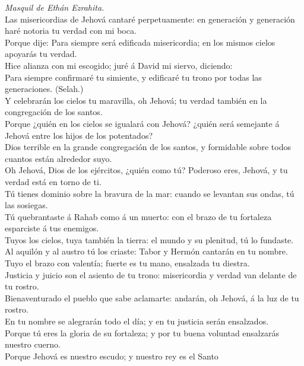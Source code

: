  \emph{Masquil de Ethán Ezrahita.}\\
Las misericordias de Jehová cantaré perpetuamente: en generación y
generación haré notoria tu verdad con mi boca.\\
 Porque dije: Para siempre será edificada misericordia; en
los mismos cielos apoyarás tu verdad.\\
 Hice alianza con mi escogido; juré á David mi siervo,
diciendo:\\
 Para siempre confirmaré tu simiente, y edificaré tu trono
por todas las generaciones. (Selah.)\\
 Y celebrarán los cielos tu maravilla, oh Jehová; tu verdad
también en la congregación de los santos.\\
 Porque ¿quién en los cielos se igualará con Jehová? ¿quién
será semejante á Jehová entre los hijos de los potentados?\\
 Dios terrible en la grande congregación de los santos, y
formidable sobre todos cuantos están alrededor suyo.\\
 Oh Jehová, Dios de los ejércitos, ¿quién como tú? Poderoso
eres, Jehová, y tu verdad está en torno de ti.\\
 Tú tienes dominio sobre la bravura de la mar: cuando se
levantan sus ondas, tú las sosiegas.\\
 Tú quebrantaste á Rahab como á un muerto: con el brazo de
tu fortaleza esparciste á tus enemigos.\\
 Tuyos los cielos, tuya también la tierra: el mundo y su
plenitud, tú lo fundaste.\\
 Al aquilón y al austro tú los criaste: Tabor y Hermón
cantarán en tu nombre.\\
 Tuyo el brazo con valentía; fuerte es tu mano, ensalzada
tu diestra.\\
 Justicia y juicio son el asiento de tu trono: misericordia
y verdad van delante de tu rostro.\\
 Bienaventurado el pueblo que sabe aclamarte: andarán, oh
Jehová, á la luz de tu rostro.\\
 En tu nombre se alegrarán todo el día; y en tu justicia
serán ensalzados.\\
 Porque tú eres la gloria de su fortaleza; y por tu buena
voluntad ensalzarás nuestro cuerno.\\
 Porque Jehová es nuestro escudo; y nuestro rey es el Santo

